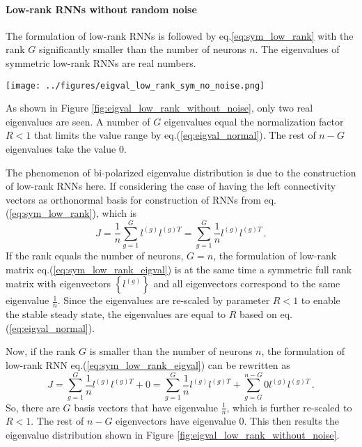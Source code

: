 \documentclass[11pt]{article}
\begin{document}
	\paragraph{Low-rank RNNs without random noise}
	The formulation of low-rank RNNs is followed by eq.\ref{eq:sym_low_rank} with the rank $G$ significantly smaller than the number of neurons $n$. The eigenvalues of symmetric low-rank RNNs are real numbers. 
		\begin{SCfigure}[0.9][h] 
			\centering 
			\caption[Eigenvalue distribution of symmetric low-rank RNNs without random noise]{\textbf{Eigenvalue distribution of symmetric low-rank RNNs without random noise.} The eigenvalues of symmetric low-rank RNNs are real numbers (x-axis). With rank $G = 1 \ll n = 200$ the number of neurons, $1$ eigenvalue takes the value of normalization factor $R = 0.85$, and the rest $n-G = 199$ eigenvalues equal $0$. }
			\texttt{[image: ../figures/eigval\_low\_rank\_sym\_no\_noise.png]}
			\label{fig:eigval_low_rank_without_noise}
		\end{SCfigure}
	
	As shown in Figure \ref{fig:eigval_low_rank_without_noise}, only two real eigenvalues are seen. A number of $G$ eigenvalues equal the normalization factor $R < 1$ that limits the value range by eq.(\ref{eq:eigval_normal}). The rest of $n-G$ eigenvalues take the value $0$. 
	
	The phenomenon of bi-polarized eigenvalue distribution is due to the construction of low-rank RNNs here. If considering the case of having the left connectivity vectors as orthonormal basis for construction of RNNs from eq.(\ref{eq:sym_low_rank}), which is
		\begin{equation} \label{eq:sym_low_rank_eigval}
			J = \frac{1}{n}\sum_{g =1}^{G} l^{(g)} l^{(g)T} = \sum_{g =1}^{G} \frac{1}{n} l^{(g)} l^{(g)T}\, . 
		\end{equation}
	If the rank equals the number of neurons, $G = n$, the formulation of low-rank matrix eq.(\ref{eq:sym_low_rank_eigval}) is at the same time a symmetric full rank matrix with eigenvectors $\left\{l^{(g)}\right\}$ and all eigenvectors correspond to the same eigenvalue $\frac{1}{n}$. Since the eigenvalues are re-scaled by parameter $R < 1$ to enable the stable steady state, the eigenvalues are equal to $R$ based on eq.(\ref{eq:eigval_normal}). 
	
	Now, if the rank $G$ is smaller than the number of neurons $n$, the formulation of low-rank RNN eq.(\ref{eq:sym_low_rank_eigval}) can be rewritten as 
		\begin{equation} \label{eq:sym_low_rank_without_noise_eigval}
			J = \sum_{g =1}^{G} \frac{1}{n} l^{(g)} l^{(g)T} + 0 = \sum_{g =1}^{G} \frac{1}{n} l^{(g)} l^{(g)T} + \sum_{g =G}^{n-G} 0 l^{(g)} l^{(g)T} \, .
		\end{equation}
	So, there are $G$ basis vectors that have eigenvalue $\frac{1}{n}$, which is further re-scaled to $R < 1$. The rest of $n-G$ eigenvectors have eigenvalue $0$. This then results the eigenvalue distribution shown in Figure \ref{fig:eigval_low_rank_without_noise}. 
	
\end{document}
